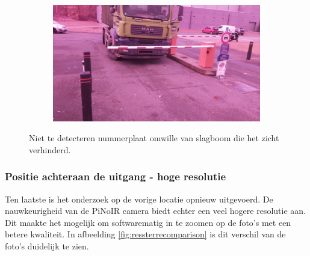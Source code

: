 \begin{figure}[h!]
	\centering
	\begin{subfigure}[b]{0.99\linewidth}
		\includegraphics[width=\linewidth]{img/sterachter/sterachter3.jpg}
	\end{subfigure}
	\caption{Niet te detecteren nummerplaat omwille van slagboom die het zicht verhinderd.}
	\label{fig:slagboomster}
\end{figure}

\subsubsection{Positie achteraan de uitgang - hoge resolutie}
Ten laatste is het onderzoek op de vorige locatie opnieuw uitgevoerd. De nauwkeurigheid van de PiNoIR camera biedt echter een veel hogere resolutie aan. Dit maakte het mogelijk om softwarematig in te zoomen op de foto's met een betere kwaliteit. In afbeelding \ref{fig:ressterrecomparison} is dit verschil van de foto's duidelijk te zien.

